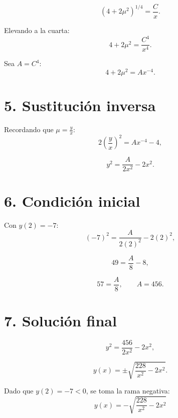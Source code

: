 \documentclass[a4paper,12pt]{article}
\begin{document}
\[
(4 + 2\mu^{2})^{1/4} = \frac{C}{x}.
\]

Elevando a la cuarta:
\[
4 + 2\mu^{2} = \frac{C^{4}}{x^{4}}.
\]

Sea \(A = C^{4}\):
\[
4 + 2\mu^{2} = A x^{-4}.
\]

\section*{5. Sustitución inversa}
Recordando que \(\mu = \tfrac{y}{x}\):
\[
2\left(\frac{y}{x}\right)^{2} = A x^{-4} - 4,
\]

\[
y^{2} = \frac{A}{2x^{2}} - 2x^{2}.
\]

\section*{6. Condición inicial}
Con \(y(2) = -7\):
\[
(-7)^{2} = \frac{A}{2(2)^{2}} - 2(2)^{2},
\]

\[
49 = \frac{A}{8} - 8,
\]

\[
57 = \frac{A}{8}, \qquad A = 456.
\]

\section*{7. Solución final}
\[
y^{2} = \frac{456}{2x^{2}} - 2x^{2},
\]

\[
y(x) = \pm \sqrt{\frac{228}{x^{2}} - 2x^{2}}.
\]

Dado que \(y(2) = -7 < 0\), se toma la rama negativa:
\[
\boxed{\, y(x) = -\sqrt{\frac{228}{x^{2}} - 2x^{2}} \,}
\]
\end{document}
